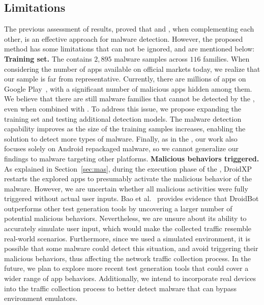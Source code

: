 \subsection{Limitations}\label{sec:limitations}

The previous assessment of results, proved that \mas and \net, when complementing each other, is an effective approach for malware detection. However, the proposed method has some limitations that can not be ignored, and are mentioned below:\newline
\textbf{Training set.} The \cds contains $2,895$ malware samples across $116$ families. When considering the number of apps available on official markets today, we realize that our sample is far from representative. Currently, there are millions of apps on Google Play~\cite{bankmycell}, with a significant number of malicious apps hidden among them. We believe that there are still malware families that cannot be detected by the \mas, even when combined with \net. To address this issue, we propose expanding the training set and testing additional detection models. The malware detection capability improves as the size of the training samples increases, enabling the solution to detect more types of malware. Finally, as in the \fhc, our work also focuses solely on Android repackaged malware, so we cannot generalize our findings to malware targeting other platforms.\newline
\textbf{Malicious behaviors triggered.} As explained in Section~\ref{sec:mas}, during the execution phase of the \fhc, DroidXP restarts the explored apps to presumably activate the malicious behavior of the malware. However, we are uncertain whether all malicious activities were fully triggered without actual user inputs. Bao et al.~\cite{DBLP:conf/wcre/BaoLL18} provides evidence that DroidBot outperforms other test generation tools by uncovering a larger number of potential malicious behaviors. Nevertheless, we are unsure about its ability to accurately simulate user input, which would make the collected traffic resemble real-world scenarios. Furthermore, since we used a simulated environment, it is possible that some malware could detect this situation, and avoid triggering their malicious behaviors, thus affecting the network traffic collection process. In the future, we plan to explore more recent test generation tools that could cover a wider range of app behaviors. Additionally, we intend to incorporate real devices into the traffic collection process to better detect malware that can bypass environment emulators.